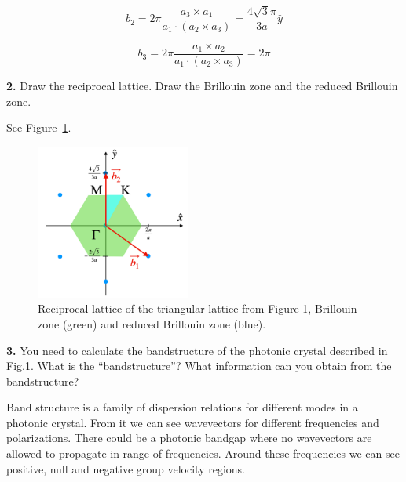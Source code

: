 \documentclass[11pt,a4paper]{article}
\begin{document}
\begin{equation*}
    b_2=2\pi \frac{a_3\times a_1}{a_1 \cdot(a_2 \times a_3)}= \frac{4\sqrt{3}\pi}{3a} \hat{y} 
\end{equation*}

\begin{equation*}
    b_3=2\pi \frac{a_1\times a_2}{a_1 \cdot(a_2 \times a_3)}= 2 \pi 
\end{equation*}

\begin{displayquote}
\textbf{2.} Draw the reciprocal lattice. Draw the Brillouin zone and the reduced Brillouin zone.
\end{displayquote}
See Figure~\ref{fig:fig2}.
\begin{figure}[ht]
   \centering
    \includegraphics[width=0.45\textwidth]{fig2.png}
    \caption{Reciprocal lattice of the triangular lattice from Figure 1, Brillouin zone (green) and reduced Brillouin zone (blue).}
    \label{fig:fig2}
\end{figure}

\begin{displayquote}
\textbf{3.} You need to calculate the bandstructure of the photonic crystal described in Fig.1. What is the “bandstructure”? What information can you obtain from the bandstructure?
\end{displayquote}

Band structure is a family of dispersion relations for different modes in a photonic crystal. From it we can see wavevectors for different frequencies and polarizations. There could be a photonic bandgap where no wavevectors are allowed to propagate in range of frequencies. Around these frequencies we can see positive, null and negative group velocity regions. 
\end{document}
